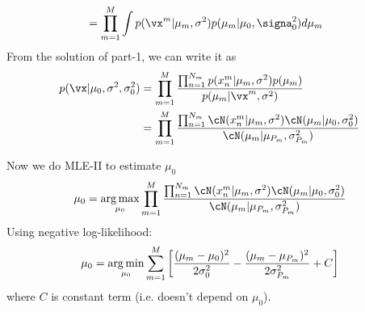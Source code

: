 \documentclass[a4paper,11pt]{article}
\begin{document}
\begin{pmisolution}
\begin{equation*}
\begin{split}
        &= \prod_{m=1}^{M} \int p(\vx^{m}|\mu_m, \sigma^2)p(\mu_m|\mu_0,\signa_0^2) d\mu_m
    \end{split}
\end{equation*}
From the solution of part-1, we can write it as
\begin{equation*}
    \begin{split}
        p(\vx | \mu_0, \sigma^2, \sigma_0^2) &= \prod_{m=1}^{M} \frac{\prod_{n=1}^{N_m} p(x_n^{m}|\mu_m, \sigma^2)p(\mu_m)}{p(\mu_m|\vx^{m},\sigma^2)} \\
        &= \prod_{m=1}^{M} \frac{\prod_{n=1}^{N_m} \cN(x_n^m|\mu_m, \sigma^2) \cN(\mu_m|\mu_0,\sigma_0^2)}{\cN(\mu_m | \mu_{P_m}, \sigma_{P_m}^2)}
    \end{split}
\end{equation*}

\noindent Now we do MLE-II to estimate $\mu_0$
\begin{equation*}
    \mu_0 = \argmax_{\mu_0} \prod_{m=1}^{M} \frac{\prod_{n=1}^{N_m} \cN(x_n^m|\mu_m, \sigma^2) \cN(\mu_m|\mu_0,\sigma_0^2)}{\cN(\mu_m | \mu_{P_m}, \sigma_{P_m}^2)}
\end{equation*}
Using negative log-likelihood:
\begin{equation*}
    \mu_0 = \mathop{\arg\min}_{\mu_0} \sum_{m=1}^{M} \left[ \frac{(\mu_m - \mu_0)^2}{2\sigma_0^2} - \frac{(\mu_m - \mu_{P_m})^2}{2\sigma_{P_m}^2} + C \right]
\end{equation*}
where $C$ is constant term (i.e. doesn't depend on $\mu_0$).


\end{pmisolution}
\end{document}
